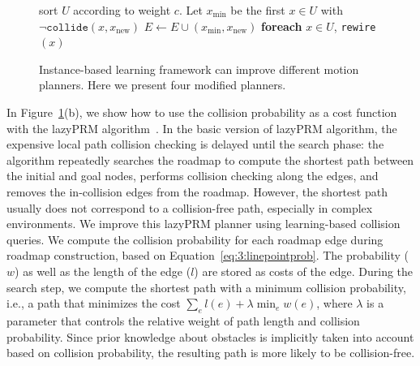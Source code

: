 \begin{figure}[!h]
{{\begin{minipage}{0.48\linewidth}
\begin{algorithmic}
        \STATE \quad \quad \quad sort $U$ according to weight $c$.
        \STATE \quad \quad \quad Let $x_{\text{min}}$ be the first $x \in U$ with $\neg \texttt{collide}(x, x_{\text{new}})$
        \STATE \quad \quad \quad $E \leftarrow E \cup (x_{\text{min}}, x_{\text{new}})$
        \STATE \quad \quad \quad \textbf{foreach} $x \in U$, \texttt{rewire}$(x)$
      \end{algorithmic}
  \end{minipage}}}
  \caption[Instance-based learning framework can be easily integrated with different motion planners]{Instance-based learning framework can improve different motion planners. Here we present four modified planners.}
  \label{fig:3:planners}
\end{figure}

In Figure~\ref{fig:3:planners}(b), we show how to use the collision probability as a cost function with the lazyPRM algorithm~\cite{Kavraki96}. In the basic version of lazyPRM algorithm, the expensive local path collision checking is delayed until the search phase: the algorithm repeatedly searches the roadmap to compute the shortest path between the initial and goal nodes, performs collision checking along the edges, and removes the in-collision edges from the roadmap. However, the shortest path usually does not correspond to a collision-free path, especially in complex environments. We improve this lazyPRM planner using learning-based collision queries. We compute the collision probability for each roadmap edge during roadmap construction, based on Equation~\ref{eq:3:linepointprob}. The probability ($w$) as well as the length of the edge ($l$) are stored as costs of the edge. During the search step, we compute the shortest path with a minimum collision probability, i.e., a path that minimizes the cost $\sum_{e} l(e) + \lambda \min_{e} w(e)$, where $\lambda$ is a parameter that controls the relative weight of path length and collision probability. Since prior knowledge about obstacles is implicitly taken into account based on collision probability, the resulting path is more likely to be collision-free.


